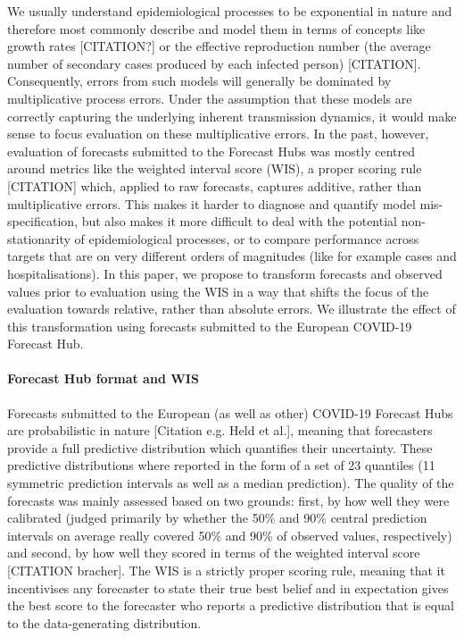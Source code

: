 \documentclass{article}
\begin{document}
We usually understand epidemiological processes to be exponential in nature and therefore most commonly describe and model them in terms of concepts like growth rates [CITATION?] or the effective reproduction number (the average number of secondary cases produced by each infected person) [CITATION]. Consequently, errors from such models will generally be dominated by multiplicative process errors. Under the assumption that these models are correctly capturing the underlying inherent transmission dynamics, it would make sense to focus evaluation on these multiplicative errors. In the past, however, evaluation of forecasts submitted to the Forecast Hubs was mostly centred around metrics like the weighted interval score (WIS), a proper scoring rule [CITATION] which, applied to raw forecasts, captures additive, rather than multiplicative errors. This makes it harder to diagnose and quantify model mis-specification, but also makes it more difficult to deal with the potential non-stationarity of epidemiological processes, or to compare performance across targets that are on very different orders of magnitudes (like for example cases and hospitalisations). In this paper, we propose to transform forecasts and observed values prior to evaluation using the WIS in a way that shifts the focus of the evaluation towards relative, rather than absolute errors. We illustrate the effect of this transformation using forecasts submitted to the European COVID-19 Forecast Hub. 

\paragraph{Forecast Hub format and WIS}
Forecasts submitted to the European (as well as other) COVID-19 Forecast Hubs are probabilistic in nature [Citation e.g. Held et al.], meaning that forecasters provide a full predictive distribution which quantifies their uncertainty. These predictive distributions where reported in the form of a set of 23 quantiles (11 symmetric prediction intervals as well as a median prediction). The quality of the forecasts was mainly assessed based on two grounds: first, by how well they were calibrated (judged primarily by whether the 50\% and 90\% central prediction intervals on average really covered 50\% and 90\% of observed values, respectively) and second, by how well they scored in terms of the weighted interval score [CITATION bracher]. The WIS is a strictly proper scoring rule, meaning that it incentivises any forecaster to state their true best belief and in expectation gives the best score to the forecaster who reports a predictive distribution that is equal to the data-generating distribution. 
\end{document}
